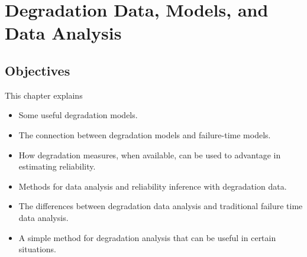 
\setcounter{chapter}{12}


\chapter{Degradation Data, Models, and Data Analysis}
\label{chapter:degradation.data}



\section*{Objectives}
This chapter explains
\begin{itemize} 
\item 
Some useful degradation models.
\item
The connection
between degradation models and failure-time models.
\item
How degradation measures, when available, can be used to advantage
in estimating reliability.
\item 
Methods for data analysis and reliability inference with
degradation data.
\item 
The differences between degradation data analysis and traditional
failure time data analysis.
\item
A simple method for degradation analysis that can be useful in
certain situations.
\end{itemize}

